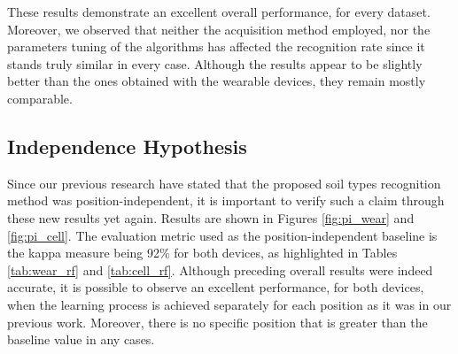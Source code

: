 \documentclass[10pt,conference]{IEEEtran}
\begin{document}
These results demonstrate an excellent overall performance, for every dataset. Moreover, we observed that neither the acquisition method employed, nor the parameters tuning of the algorithms has affected the recognition rate since it stands truly similar in every case. Although the results appear to be slightly better than the ones obtained with the wearable devices, they remain mostly comparable. %


\subsection{Independence Hypothesis}

Since our previous research have stated that the proposed soil types recognition method was position-independent, it is important to verify such a claim through these new results yet again. Results are shown in Figures \ref{fig:pi_wear} and \ref{fig:pi_cell}. The evaluation metric used as the position-independent baseline is the kappa measure being 92\% for both devices, as highlighted in Tables \ref{tab:wear_rf} and \ref{tab:cell_rf}. Although preceding overall results were indeed accurate, it is possible to observe an excellent performance, for both devices, when the learning process is achieved separately for each position as it was in our previous work. Moreover, there is no specific position that is greater than the baseline value in any cases.

\end{document}
